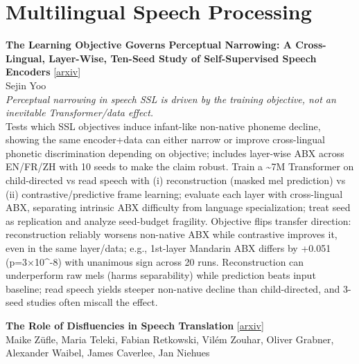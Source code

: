 \documentclass[12pt,letterpaper]{article}
\begin{document}
\medskip


\section*{Multilingual Speech Processing}

{\small\textbf{The Learning Objective Governs Perceptual Narrowing: A Cross-Lingual, Layer-Wise, Ten-Seed Study of Self-Supervised Speech Encoders}} {\scriptsize[\href{https://arxiv.org/abs/2608.00507}{arxiv}]}\\
{\scriptsize Sejin Yoo}\\

{\small\textit{Perceptual narrowing in speech SSL is driven by the training objective, not an inevitable Transformer/data effect.}}\\[1pt]
{\footnotesize Tests which SSL objectives induce infant-like non-native phoneme decline, showing the same encoder+data can either narrow or improve cross-lingual phonetic discrimination depending on objective; includes layer-wise ABX across EN/FR/ZH with 10 seeds to make the claim robust. Train a \textasciitilde{}7M Transformer on child-directed vs read speech with (i) reconstruction (masked mel prediction) vs (ii) contrastive/predictive frame learning; evaluate each layer with cross-lingual ABX, separating intrinsic ABX difficulty from language specialization; treat seed as replication and analyze seed-budget fragility. Objective flips transfer direction: reconstruction reliably worsens non-native ABX while contrastive improves it, even in the same layer/data; e.g., 1st-layer Mandarin ABX differs by +0.051 (p=3×10\textasciicircum{}-8) with unanimous sign across 20 runs. Reconstruction can underperform raw mels (harms separability) while prediction beats input baseline; read speech yields steeper non-native decline than child-directed, and 3-seed studies often miscall the effect.}

\medskip

{\small\textbf{The Role of Disfluencies in Speech Translation}} {\scriptsize[\href{https://arxiv.org/abs/2608.02138}{arxiv}]}\\
{\scriptsize Maike Z\"ufle, Maria Teleki, Fabian Retkowski, Vil\'em Zouhar, Oliver Grabner, Alexander Waibel, James Caverlee, Jan Niehues}\\
\end{document}

